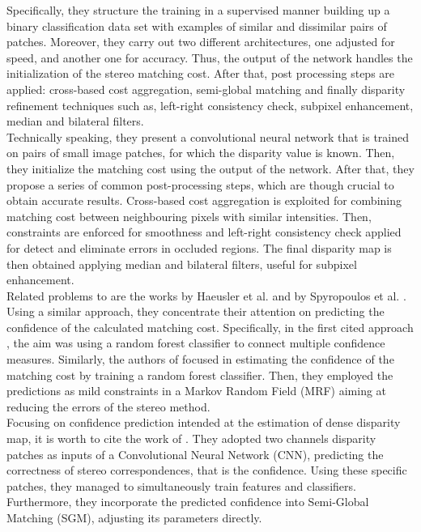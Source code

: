 Specifically, they structure the training in a supervised manner building up a binary classification data set with examples of similar and dissimilar pairs of patches. 
Moreover, they carry out two different architectures, one adjusted for speed, and another one for accuracy. 
Thus, the output of the network handles the initialization of the stereo matching cost. 
After that, post processing steps are applied: cross-based cost aggregation, semi-global matching and finally disparity refinement techniques such as, left-right consistency check, subpixel enhancement, median and bilateral filters.\\
Technically speaking, they present a convolutional neural network that is trained on pairs of small image patches, for which the disparity value is known. 
Then, they initialize the matching cost using the output of the network.
After that, they propose a series of common post-processing steps, which are though crucial to obtain accurate results.
Cross-based cost aggregation is exploited for combining matching cost between neighbouring pixels with similar intensities. Then, constraints are enforced for smoothness and left-right consistency check applied for detect and eliminate errors in occluded regions. 
The final disparity map is then obtained applying median and bilateral filters, useful for subpixel enhancement. \\
Related problems to \cite{Zbontar2016} are the works by Haeusler et al. \cite{Haeusler2013} and by Spyropoulos et al. \cite{Spyropoulos2014}. 
Using a similar approach, they concentrate their attention on predicting the confidence of the calculated matching cost. 
Specifically, in the first cited approach \cite{Haeusler2013}, the aim was using a random forest classifier to connect multiple confidence measures. 
Similarly, the authors of \cite{Spyropoulos2014} focused in estimating the confidence of the matching cost by training a random forest classifier. 
Then, they employed the predictions as mild constraints in a Markov Random Field (MRF) aiming at reducing the errors of the stereo method.\\
Focusing on confidence prediction intended at the estimation of dense disparity map, it is worth to cite the work of \cite{Seki2016}.
They adopted two channels disparity patches as inputs of a Convolutional Neural Network (CNN), predicting the correctness of stereo correspondences, that is the confidence. 
Using these specific patches, they managed to simultaneously train features and classifiers.
Furthermore, they incorporate the predicted confidence into Semi-Global Matching (SGM), adjusting its parameters directly. \\
